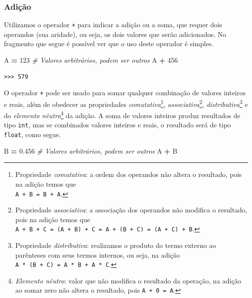 \documentclass[
]{book}
\newenvironment{Shaded}{\begin{snugshade}}{\end{snugshade}}
\newcommand{\CommentTok}[1]{\textcolor[rgb]{0.56,0.35,0.01}{\textit{#1}}}
\newcommand{\DecValTok}[1]{\textcolor[rgb]{0.00,0.00,0.81}{#1}}
\newcommand{\FloatTok}[1]{\textcolor[rgb]{0.00,0.00,0.81}{#1}}
\newcommand{\NormalTok}[1]{#1}
\newcommand{\OperatorTok}[1]{\textcolor[rgb]{0.81,0.36,0.00}{\textbf{#1}}}
\begin{document}
\hypertarget{adiuxe7uxe3o}{%
\subsubsection{Adição}\label{adiuxe7uxe3o}}

Utilizamos o operador \texttt{+} para indicar a adição ou a soma, que requer dois operandos (sua aridade), ou seja, os dois valores que serão adicionados. No fragmento que segue é possível ver que o uso deste operador é simples.

\begin{Shaded}
\begin{Highlighting}[]
\NormalTok{A }\OperatorTok{=} \DecValTok{123} \CommentTok{\# Valores arbitrários, podem ser outros}
\NormalTok{A }\OperatorTok{+} \DecValTok{456}
\end{Highlighting}
\end{Shaded}

\begin{verbatim}
>>> 579
\end{verbatim}

O operador \texttt{+} pode ser usado para somar qualquer combinação de valores inteiros e reais, além de obedecer as propriedades \emph{comutativa}\footnote{Propriedade \emph{comutativa}: a ordem dos operandos não altera o resultado, pois na adição temos que\\
  \texttt{A\ +\ B\ =\ B\ +\ A}.}, \emph{associativa}\footnote{Propriedade \emph{associativa}: a associação dos operandos não modifica o resultado, pois na adição temos que\\
  \texttt{A\ +\ B\ +\ C\ =\ (A\ +\ B)\ +\ C\ =\ A\ +\ (B\ +\ C)\ =\ (A\ +\ C)\ +\ B}.}, \emph{distributiva}\footnote{Propriedade \emph{distributiva}: realizamos o produto do termo externo ao parênteses com seus termos internos, ou seja, na adição \texttt{A\ *\ (B\ +\ C)\ =\ A\ *\ B\ +\ A\ *\ C}.} e do \emph{elemento nêutro}\footnote{\emph{Elemento nêutro}: valor que não modifica o resultado da operação, na adição ao somar zero não altera o resultado, pois \texttt{A\ +\ 0\ =\ A}.} da adição. A soma de valores inteiros produz resultados de tipo \texttt{int}, mas se combinados valores inteiros e reais, o resultado será de tipo \texttt{float}, como segue.

\begin{Shaded}
\begin{Highlighting}[]
\NormalTok{B }\OperatorTok{=} \FloatTok{0.456} \CommentTok{\# Valores arbitrários, podem ser outros}
\NormalTok{A }\OperatorTok{+}\NormalTok{ B}
\end{Highlighting}
\end{Shaded}
\end{document}
